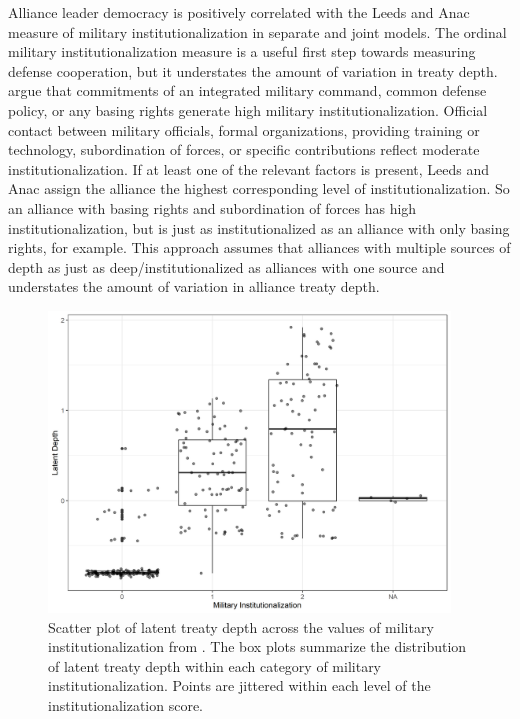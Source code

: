\documentclass[12pt]{article}
\begin{document}
Alliance leader democracy is positively correlated with the Leeds and Anac measure of military institutionalization in separate and joint models.
The ordinal military institutionalization measure is a useful first step towards measuring defense cooperation, but it understates the amount of variation in treaty depth. 
\citet{LeedsAnac2005} argue that commitments of an integrated military command, common defense policy, or any basing rights generate high military institutionalization. 
Official contact between military officials, formal organizations, providing training or technology, subordination of forces, or specific contributions reflect moderate institutionalization. 
If at least one of the relevant factors is present, Leeds and Anac assign the alliance the highest corresponding level of institutionalization. 
So an alliance with basing rights and subordination of forces has high institutionalization, but is just as institutionalized as an alliance with only basing rights, for example. 
This approach assumes that alliances with multiple sources of depth as just as deep/institutionalized as alliances with one source and understates the amount of variation in alliance treaty depth.


\begin{figure}[htbp]
	\centering
		\includegraphics[width=0.95\textwidth]{milinst-comp.png}
	\caption{Scatter plot of latent treaty depth across the values of military institutionalization from \citet{LeedsAnac2005}. The box plots summarize the distribution of latent treaty depth within each category of military institutionalization. Points are jittered within each level of the institutionalization score.}
	\label{fig:milinst-comp}
\end{figure} 
\end{document}
